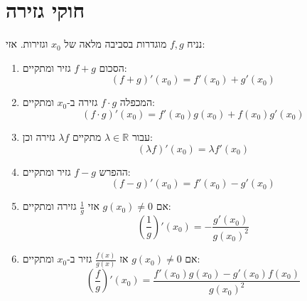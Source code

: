 \documentclass{tstextbook}
\begin{document}
\section{חוקי גזירה}

\begin{proposition}
נניח \(f,g\) מוגדרות בסביבה מלאה של \(x_{0}\) וגזירות. אזי:

  \begin{enumerate}
    \item הסכום \(f+g\) גזיר ומתקיים: 
$$(f+g)'(x_{0})= f'(x_{0})+g'(x_{0})$$


    \item המכפלה \(f\cdot g\) גזירה ב-\(x_{0}\) ומתקיים: 
$$\left( f\cdot g \right)'(x_{0})=f'(x_{0})g(x_{0})+f(x_{0})g'(x_{0})$$


    \item עבור \(\lambda \in \mathbb{R}\) מתקיים \(\lambda f\) גזירה וכן: 
$$\left( \lambda f \right)'(x_{0})=\lambda f'(x_{0})$$


    \item ההפרש \(f-g\) גזיר ומתקיים: 
$$(f-g)'(x_{0})= f'(x_{0})-g'(x_{0})$$


    \item אם \(g(x_{0})\neq 0\) אזי \(\frac{1}{g}\) גזירה ומתקיים: 
$$\left( \frac{1}{g} \right)'(x_{0})=-\frac{g'(x_{0})}{g(x_{0})^{2}}$$


    \item אם \(g(x_{0})\neq 0\) אז \(\frac{f(x)}{g(x)}\) גזיר ב-\(x_{0}\) ומתקיים: 
$$\left( \frac{f}{g} \right)'(x_{0})= \frac{f'(x_{0})g(x_{0})-g'(x_{0})f(x_{0})}{g(x_{0})^{2}}$$


  \end{enumerate}
\end{proposition}
\end{document}
